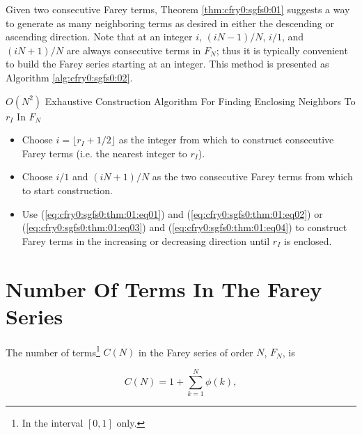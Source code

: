 Given two consecutive Farey terms, Theorem \ref{thm:cfry0:sgfs0:01} suggests
a way to generate as many neighboring terms as desired in either the
descending or ascending direction.  Note that at an integer $i$,
$(iN-1)/N$, $i/1$, and $(iN+1)/N$ are always consecutive terms
in $F_N$; thus it is typically convenient to build the Farey series
starting at an integer.  This method is presented as 
Algorithm \ref{alg:cfry0:sgfs0:02}.

\begin{vworkalgorithmstatementpar}{\mbox{\boldmath $O(N^2)$} Exhaustive 
                                   Construction
                                   Algorithm For Finding Enclosing
                                   Neighbors To \mbox{\boldmath $r_I$}
                                   In \mbox{\boldmath $F_N$}}
\label{alg:cfry0:sgfs0:02}
\begin{itemize}
\item Choose $i = \lfloor r_I + 1/2 \rfloor$ as the integer from which
      to construct consecutive Farey terms (i.e. the nearest integer
      to $r_I$).

\item Choose $i/1$ and $(iN+1)/N$ as the two consecutive Farey terms from
      which to start construction.

\item Use (\ref{eq:cfry0:sgfs0:thm:01:eq01}) and 
      (\ref{eq:cfry0:sgfs0:thm:01:eq02}) or  
      (\ref{eq:cfry0:sgfs0:thm:01:eq03}) and 
      (\ref{eq:cfry0:sgfs0:thm:01:eq04}) to construct Farey terms
      in the increasing or decreasing direction until $r_I$ is
      enclosed.
\end{itemize}
\end{vworkalgorithmstatementpar}
\vworkalgorithmfooter{}

\section{Number Of Terms In The Farey Series}

The number of terms\footnote{In the interval $[0,1]$ only.} 
$C(N)$ in the Farey series of order $N$, $F_N$, is

\begin{equation}
C(N) = 1 + \sum_{k=1}^{N} \phi (k) ,
\end{equation}

